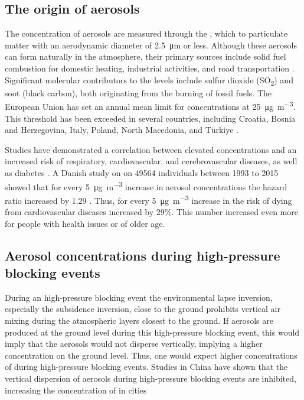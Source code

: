 \subsection{The origin of aerosols}
The concentration of aerosols are measured through the \PM, which to particulate matter with an aerodynamic diameter of \SI{2.5}{\micro\meter} or less. Although these aerosols can form naturally in the atmosphere, their primary sources include solid fuel combustion for domestic heating, industrial activities, and road transportation \cite{europeanenvironmentagencyEuropesAirQuality2024}. Significant molecular contributors to the \PM levels include sulfur dioxide (SO\textsubscript{2}) and soot (black carbon), both originating from the burning of fossil fuels. The European Union has set an annual mean limit for \PM  concentrations at \SI{25}{\micro\gram\per\cubic\meter}. This threshold has been exceeded in several countries, including Croatia, Bosnia and Herzegovina, Italy, Poland, North Macedonia, and Türkiye \cite{europeanenvironmentagencyEuropesAirQuality2024}. 

Studies have demonstrated a correlation between elevated \PM concentrations and an increased risk of respiratory, cardiovascular, and cerebrovascular diseases, as well as diabetes \cite{sharmaHealthEffectsAssociated2020}. A Danish study on on \SI{49564}{} individuals between 1993 to 2015 showed that for every \SI{5}{\micro\gram\per
\m\cubed} increase in aerosol concentrations the hazard ratio increased by 1.29 \cite{hvidtfeldtLongtermResidentialExposure2019}. Thus, for every \SI{5}{\micro\gram\per
\m\cubed} increase in \PM the risk of dying from cardiovascular diseases increased by 29\%. This number increased even more for people with health issues or of older age.  

\subsection{Aerosol concentrations during high-pressure blocking events}
During an high-pressure blocking event the environmental lapse inversion, especially the subsidence inversion, close to the ground prohibits vertical air mixing during the atmospheric layers closest to the ground. If aerosols are produced at the ground level during this high-pressure blocking event, this would imply that the aerosols would not disperse vertically, implying a higher concentration on the ground level. Thus, one would expect higher concentrations of \PM during high-pressure blocking events. Studies in China have shown that the vertical dispersion of aerosols during high-pressure blocking events are inhibited, increasing the concentration of \PM in cities \cite{caiImpactBlockingStructure2020}

